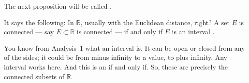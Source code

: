 \begin{speech}[00:02:08 - 00:03:33]
The next proposition will be called  .

It says the following: In $\mathbb{R}$, usually with the Euclidean distance, right?  A set $E$ is connected --- say $E \subset \mathbb{R}$  is connected  --- if and only if  $E$ is an interval .

You know from Analysis~1 what an interval is. It can be open or closed from any of the sides; it could be from minus infinity to a value, to plus infinity. Any interval works here. And this is an if and only if. So, these are precisely the connected subsets of $\mathbb{R}$.
\end{speech}

\begin{content}
\end{content}

